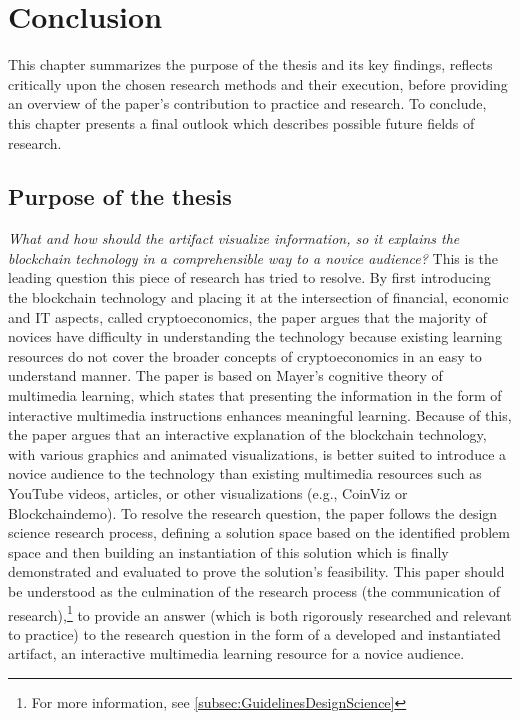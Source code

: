 \chapter{Conclusion} \label{chap:conclusion}

This chapter summarizes the purpose of the thesis and its key findings, reflects critically upon the chosen research methods and their execution, before providing an overview of the paper's contribution to practice and research. To conclude, this chapter presents a final outlook which describes possible future fields of research. 

\section{Purpose of the thesis} \label{sec:findings}
\textit{What and how should the artifact visualize information, so it explains the blockchain technology in a comprehensible way to a novice audience?} This is the leading question this piece of research has tried to resolve. By first introducing the blockchain technology and placing it at the intersection of financial, economic and IT aspects, called cryptoeconomics, the paper argues that the majority of novices have difficulty in understanding the technology because existing learning resources do not cover the broader concepts of cryptoeconomics in an easy to understand manner. The paper is based on Mayer's cognitive theory of multimedia learning, which states that presenting the information in the form of interactive multimedia instructions enhances meaningful learning. Because of this, the paper argues that an interactive explanation of the blockchain technology, with various graphics and animated visualizations, is better suited to introduce a novice audience to the technology than existing multimedia resources such as YouTube videos, articles, or other visualizations (e.g., CoinViz or Blockchaindemo). To resolve the research question, the paper follows the design science research process, defining a solution space based on the identified problem space and then building an instantiation of this solution which is finally demonstrated and evaluated to prove the solution's feasibility. This paper should be understood as the culmination of the research process (the communication of research),\footnote{For more information, see \ref{subsec:GuidelinesDesignScience}} to provide an answer (which is both rigorously researched and relevant to practice) to the research question in the form of a developed and instantiated artifact, an interactive multimedia learning resource for a novice audience. 

